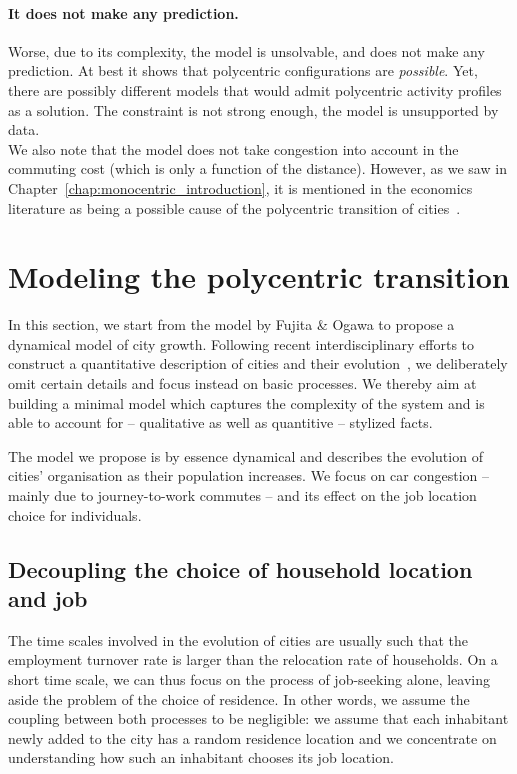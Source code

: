 \paragraph{It does not make any prediction.} Worse, due to its complexity, the
model is unsolvable, and does not make any prediction. At best it shows that
polycentric configurations are \emph{possible}. Yet, there are possibly
different models that would admit polycentric activity profiles as a solution.
The constraint is not strong enough, the model is unsupported by data.\\ 

We also note that the model does not take congestion into account in the
commuting cost (which is only a function of the distance). However, as we saw in
Chapter~\ref{chap:monocentric_introduction}, it is
mentioned in the economics literature as being a possible cause of the
polycentric transition of cities~\cite{McMillen:2003}. 


\section{Modeling the polycentric transition}
\label{sec:an_out_of_equilibrium_model_}

In this section, we start from the model by Fujita \& Ogawa to propose a
dynamical model of city growth. Following recent interdisciplinary efforts to
construct a quantitative description of cities and their
evolution~\cite{Makse:1995,Zanette:1997,Marsili:1998,Bettencourt:2007,Batty:2008},
we deliberately omit certain details and focus instead on basic processes. We
thereby aim at building a minimal model which captures the complexity of the
system and is able to account for -- qualitative as well as quantitive -- stylized
facts.  

The model we propose is by essence dynamical and describes the evolution
of cities' organisation as their population increases. We focus on car
congestion -- mainly due to journey-to-work commutes -- and its effect on the
job location choice for individuals.\\

\subsection{Decoupling the choice of household location and job}
\label{sub:decoupling_the_choice_of_household_and_job}

The time scales involved in the evolution of cities are usually such that the
employment turnover rate is larger than the relocation rate of households. On a
short time scale, we can thus focus on the process of job-seeking alone, leaving
aside the problem of the choice of residence. In other words, we assume the
coupling between both processes to be negligible: we assume that each inhabitant
newly added to the city has a random residence location and we concentrate on
understanding how such an inhabitant chooses its job location.\\

